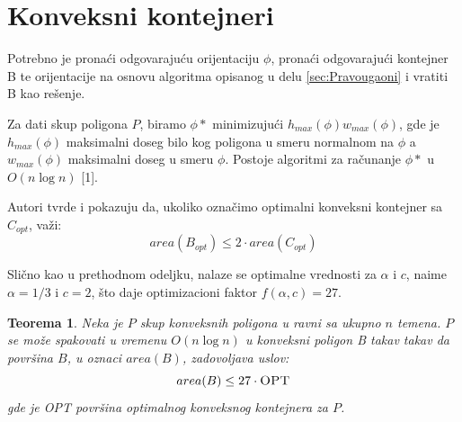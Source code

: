 \documentclass[a4paper]{article}
\theoremstyle{plain}
\newtheorem{thm}{Teorema}[section] %
\theoremstyle{definition}
\begin{document}
\section{Konveksni kontejneri}
\label{sec:Konveksni}

Potrebno je prona\'c{}i odgovaraju\'c{}u orijentaciju $\phi$, prona\'c{}i odgovaraju\'c{}i kontejner B te orijentacije na osnovu algoritma opisanog u delu \ref{sec:Pravougaoni} i vratiti B kao re\v{s}enje.

Za dati skup poligona $P$, biramo $\phi*$  minimizuju\'c{}i $h_{max}(\phi)w_{max}(\phi)$, gde je $h_{max}(\phi)$ maksimalni doseg bilo kog poligona u smeru normalnom na $\phi$ a $w_{max}(\phi)$ maksimalni doseg u smeru $\phi$. Postoje algoritmi za ra\v{c}unanje $\phi*$ u $O(n\log{}n)$ \cite{paper} [1].

Autori tvrde i pokazuju da, ukoliko ozna\v{c}imo optimalni konveksni kontejner sa $C_{opt}$, va\v{z}i: $$area(B_{opt}) \leq 2 \cdot area(C_{opt})$$

Sli\v{c}no kao u prethodnom odeljku, nalaze se optimalne vrednosti za $\alpha$ i $c$, naime $\alpha = 1/3$ i $c = 2$, \v{s}to daje optimizacioni faktor $f(\alpha, c) = 27$.

\begin{thm}
    Neka je $P$ skup konveksnih poligona u ravni sa ukupno $n$ temena. $P$ se mo\v{z}e spakovati u vremenu $O(n\log{}n)$ u konveksni poligon B takav takav da povr\v{s}ina $B$, u oznaci $area(B)$, zadovoljava uslov: $$area(B) \leq 27 \cdot \textsc{OPT}$$ gde je \textsc{OPT} povr\v{s}ina optimalnog konveksnog kontejnera za $P$.  
\end{thm}


\appendix



\end{document}
